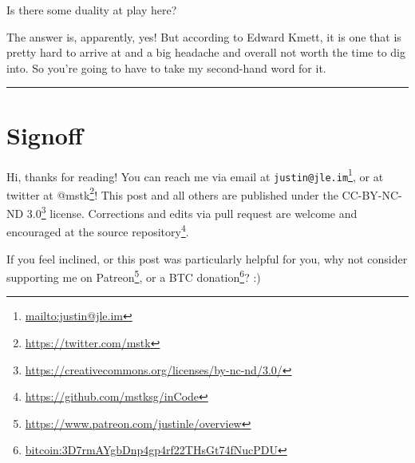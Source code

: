 \documentclass[]{article}
\renewcommand{\href}[2]{#2\footnote{\url{#1}}}
\begin{document}
Is there some duality at play here?

The answer is, apparently, yes! But according to Edward Kmett, it is one that is
pretty hard to arrive at and a big headache and overall not worth the time to
dig into. So you're going to have to take my second-hand word for it.

\begin{center}\rule{0.5\linewidth}{\linethickness}\end{center}

\hypertarget{signoff}{%
\section{Signoff}\label{signoff}}

Hi, thanks for reading! You can reach me via email at
\href{mailto:justin@jle.im}{\nolinkurl{justin@jle.im}}, or at twitter at
\href{https://twitter.com/mstk}{@mstk}! This post and all others are published
under the \href{https://creativecommons.org/licenses/by-nc-nd/3.0/}{CC-BY-NC-ND
3.0} license. Corrections and edits via pull request are welcome and encouraged
at \href{https://github.com/mstksg/inCode}{the source repository}.

If you feel inclined, or this post was particularly helpful for you, why not
consider \href{https://www.patreon.com/justinle/overview}{supporting me on
Patreon}, or a \href{bitcoin:3D7rmAYgbDnp4gp4rf22THsGt74fNucPDU}{BTC donation}?
:)
\end{document}
